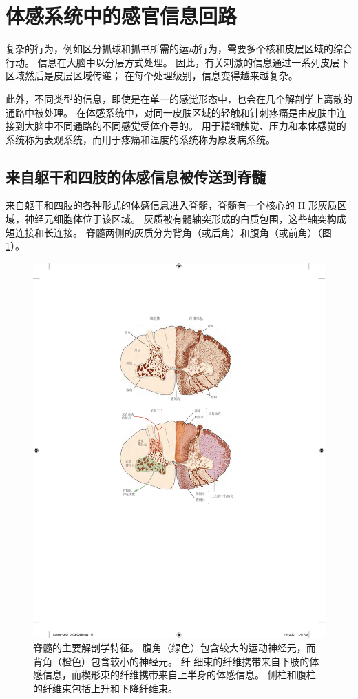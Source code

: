 \section{体感系统中的感官信息回路}
复杂的行为，例如区分抓球和抓书所需的运动行为，需要多个核和皮层区域的综合行动。 
信息在大脑中以分层方式处理。 
因此，有关刺激的信息通过一系列皮层下区域然后是皮层区域传递； 
在每个处理级别，信息变得越来越复杂。


此外，不同类型的信息，即使是在单一的感觉形态中，也会在几个解剖学上离散的通路中被处理。 
在体感系统中，对同一皮肤区域的轻触和针刺疼痛是由皮肤中连接到大脑中不同通路的不同感觉受体介导的。 
用于精细触觉、压力和本体感觉的系统称为表观系统，而用于疼痛和温度的系统称为原发病系统。


\subsection{来自躯干和四肢的体感信息被传送到脊髓}
来自躯干和四肢的各种形式的体感信息进入脊髓，脊髓有一个核心的 H 形灰质区域，神经元细胞体位于该区域。 
灰质被有髓轴突形成的白质包围，这些轴突构成短连接和长连接。 
脊髓两侧的灰质分为背角（或后角）和腹角（或前角）（图 \ref{fig:4_3}）。

\begin{figure}[htbp]
	\centering
	\includegraphics[width=1.0\linewidth]{chap04/fig_4_3}
	\caption{脊髓的主要解剖学特征。 
		腹角（绿色）包含较大的运动神经元，而背角（橙色）包含较小的神经元。 纤
		细束的纤维携带来自下肢的体感信息，而楔形束的纤维携带来自上半身的体感信息。 
		侧柱和腹柱的纤维束包括上升和下降纤维束。}
	\label{fig:4_3}
\end{figure}


